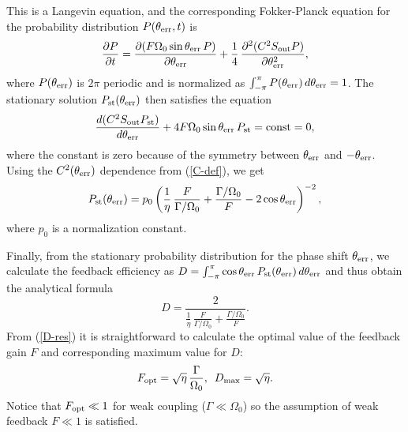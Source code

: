 This is a Langevin equation, and the corresponding Fokker-Planck equation for the probability distribution $P(\theta_{\rm err}, t)$ is
\begin{equation}
\frac{\partial P}{\partial t}= \frac{\partial (F\Omega_0\sin\theta_{\rm err} \, P)} {\partial \theta_{\rm err}} + \frac{1}{4}\, \frac{\partial^2 (C^2 S_{\rm out} P)}{\partial \theta_{\rm err}^2},
\label{F-P}
\end{equation}
where $P(\theta_{\rm err})$ is $2\pi$ periodic and is normalized as $\int_{-\pi}^{\pi} P(\theta_{\rm err})\,d\theta_{\rm err} =1$. The stationary solution $P_{\rm st}(\theta_{\rm err})$ then satisfies the equation
\begin{equation}
\frac{d(C^2 S_{\rm out} P_{\rm st})}{d\theta_{\rm err}} + 4F\Omega_0\sin\theta_{\rm err}\, P_{\rm st} ={\rm const}=0,
\end{equation}
where the constant is zero because of the symmetry between $\theta_{\rm err}$ and $-\theta_{\rm err}$. Using the $C^2(\theta_{\rm err})$ dependence from (\ref{C-def}), we get
\begin{equation}
P_{\rm st}(\theta_{\rm err})= p_0 \left( \frac{1}{\eta}\, \frac{F}{\Gamma/\Omega_0} +\frac{\Gamma/\Omega_0}{F}-2\cos\theta_{\rm err} \right) ^{-2},
\label{P_st}
\end{equation}
where $p_0$ is a normalization constant.

Finally, from the stationary probability distribution for
the phase shift $\theta_{\rm err}$, we calculate the feedback efficiency as
$D=\int_{-\pi}^\pi \cos\theta_{\rm err}\, P_{\rm st}(\theta_{\rm err}) \, d\theta_{\rm err}$
and thus obtain the analytical formula
\begin{equation}
D=\frac{2}{\displaystyle \frac{1}{\eta}\, \frac{F}{\Gamma/\Omega_0}+\frac{\Gamma/\Omega_0}{F}}.
\label{D-res}
\end{equation}
From (\ref{D-res}) it is straightforward to calculate the optimal value of the feedback gain $F$ and corresponding maximum value for $D$:
\begin{equation}
F_{\rm opt}=\sqrt{\eta} \, \frac{\Gamma}{\Omega_0} , \,\,\,  D_{\rm max}=\sqrt{\eta}.
\label{optimum}
\end{equation}
Notice that $F_{\rm opt}\ll 1$ for weak coupling ($\Gamma\ll \Omega_0$) so the assumption of weak feedback $F\ll 1$ is satisfied.


